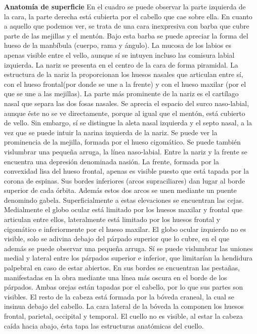 \documentclass[a4paper,12pt]{article} %
\begin{document}
\textbf{Anatomía de superficie}
En el cuadro se puede observar la parte izquierda de la cara, la parte derecha está cubierta por el cabello que cae sobre ella. En cuanto a aquello que podemos ver, se trata de una cara inexpresiva con barba que cubre parte de las mejillas y el mentón. Bajo esta barba se puede apreciar la forma del hueso de la manbíbula (cuerpo, rama y ángulo). La mucosa de los labios es apenas visible entre el vello, aunque sí se intuyen incluso las comisura labial izquierda. La nariz se presenta en el centro de la cara de forma piramidal. La estructura de la nariz la proporcionan los huesos nasales que articulan entre sí, con el hueso frontal(por donde se une a la frente) y con el hueso maxilar (por el que se une  a las mejillas). La parte más prominente de la nariz es el cartílago nasal que separa las dos fosas nasales. Se aprecia el espacio del surco naso-labial, aunque éste no se ve directamente, porque al igual que el mentón, está cubierto de vello. Sin embargo, sí se distingue la aleta nasal izquierda y el septo nasal, a la vez que se puede intuir la narina izquierda de la nariz. Se puede ver la prominencia de la mejilla, formada por el hueso cigomático. Se puede también vislumbrar una pequeña arruga, la línea naso-labial. Entre la nariz y la frente se encuentra una depresión denominada nasión. La frente, formada por la convexidad lisa del hueso frontal, apenas es visible puesto que está tapada por la corona de espinas. Sus bordes inferiores (arcos supraciliares) dan lugar al borde superior de cada órbita. Además estos dos arcos se unen mediante un puente denomindo gabela. Superficialmente a estas elevaciones se encuentran las cejas. Medialmente el globo ocular está limitado por los huesos maxilar y frontal que articulan entre ellos, lateralmente está limitado por los huesos frontal y cigomático e inferiormente por el hueso maxilar. El globo ocular izquierdo no es visible, solo se adivina debajo del párpado superior que lo cubre, en el que además se puede observar una pequeña arruga. Sí se puede vislumbrar las uniones medial y lateral entre los párpados superior e inferior, que limitarían la hendidura palpebral en caso de estar abiertos. En sus bordes se encuentran las pestañas, manifestadas en la obra mediante una línea más oscura en el borde de los párpados. Ambas orejas están tapadas por el cabello, por lo que sus partes son visibles.
El resto de la cabeza está formada por la bóveda craneal, la cual se insinua debajo del cabello. La cara lateral de la bóveda la componen los huesos frontal, parietal, occipital y temporal.
El cuello no es visible, al estar la cabeza caída hacia abajo, ésta tapa las estructuras anatómicas del cuello.
\end{document}
